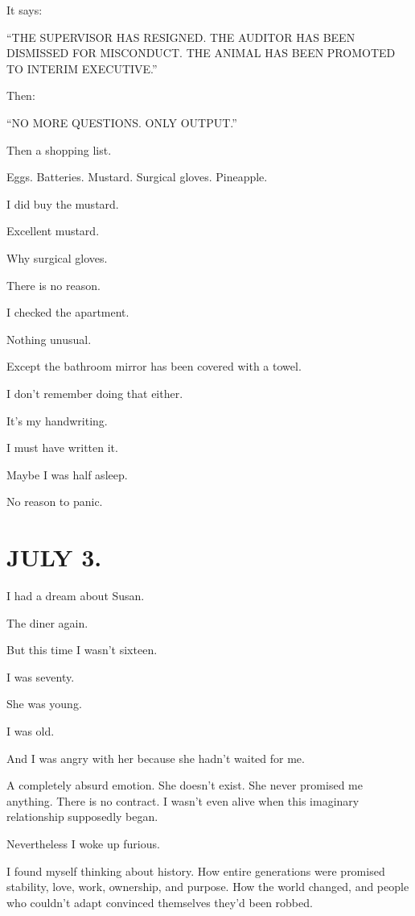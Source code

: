 \documentclass[11pt,oneside]{book}
\begin{document}
It says:

``THE SUPERVISOR HAS RESIGNED. THE AUDITOR HAS BEEN DISMISSED FOR MISCONDUCT. THE ANIMAL HAS BEEN PROMOTED TO INTERIM EXECUTIVE.''

Then:

``NO MORE QUESTIONS. ONLY OUTPUT.''

Then a shopping list.

Eggs. Batteries. Mustard. Surgical gloves. Pineapple.

I did buy the mustard.

Excellent mustard.

Why surgical gloves.

There is no reason.

I checked the apartment.

Nothing unusual.

Except the bathroom mirror has been covered with a towel.

I don't remember doing that either.

It's my handwriting.

I must have written it.

Maybe I was half asleep.

No reason to panic.

\section*{JULY 3.}

I had a dream about Susan.

The diner again.

But this time I wasn't sixteen.

I was seventy.

She was young.

I was old.

And I was angry with her because she hadn't waited for me.

A completely absurd emotion. She doesn't exist. She never promised me anything. There is no contract. I wasn't even alive when this imaginary relationship supposedly began.

Nevertheless I woke up furious.

I found myself thinking about history. How entire generations were promised stability, love, work, ownership, and purpose. How the world changed, and people who couldn't adapt convinced themselves they'd been robbed.
\end{document}
